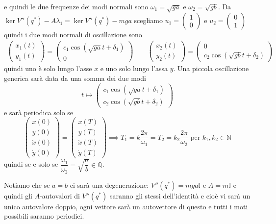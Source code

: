 \documentclass[11pt,a4paper,twoside]{book}
\newenvironment{esempio}[1][Esempio]{ 
  \begin{center}\begin{tcolorbox}[
  title={#1:\\},
  width=0.9\linewidth,
  flush right,
  enhanced jigsaw, 
  colback=white, 
  frame hidden, 
  sharpish corners, arc=3mm,
  borderline west = {1pt}{0pt}{gray},
  borderline south = {1pt}{0pt}{gray},
  coltitle=black, 
  fonttitle=\small\bfseries, 
  attach title to upper, 
  breakable,
  top=2.5pt, bottom=0.3pt]\small
  }{
 \normalsize \end{tcolorbox}\end{center}
}
\theoremstyle{esss}
\theoremstyle{dotless}
\numberwithin{equation}{section} %
\begin{document}
\begin{esempio}[Punto vincolato ad un paraboloide]
\[\]
e quindi le due frequenze dei modi normali sono $\omega_1=\sqrt{ga}$ e $\omega_2=\sqrt{gb}$.
Da $\ker{V''(q^*)-A\lambda_1}=\ker{V''(q^*)-mga}$ scegliamo $u_1=\left(\begin{array}{c}1\\0
\end{array}\right)$ e $u_2=\left(\begin{array}{c}0\\1
\end{array}\right)$ quindi i due modi normali di oscillazione sono
\begin{gather*}
\left( \begin{array}{c} x_1(t) \\y_1(t) \end{array} \right) = \left( \begin{array}{c} c_1\cos{(\sqrt{ga} t +\delta_1)} \\ 0 \end{array}\right) \qquad
\left( \begin{array}{c} x_2(t) \\y_2(t) \end{array} \right) =  \left( \begin{array}{c} 0 \\ c_2\cos{(\sqrt{gb} t +\delta_2)} \end{array}\right) 
\end{gather*}
quindi uno è solo lungo l'asse $x$ e uno solo lungo l'assa $y$. Una piccola oscillazione generica sarà data da una somma dei due modi
\[
t\mapsto \left(\begin{array}{c}
c_1\cos{(\sqrt{ga}t+\delta_1)} \\ c_2\cos{(\sqrt{gb}t+\delta_2)} 
\end{array}\right)
\]
e sarà periodica solo se
\[
\left(\begin{array}{c} x(0)\\ y(0) \\ \dot{x}(0) \\ \dot{y}(0) \end{array}\right)=\left(\begin{array}{c} x(T)\\ y(T) \\ \dot{x}(T) \\ \dot{y}(T) \end{array}\right) \implies
 T_1=k\dfrac{2\pi}{\omega_1} = T_2 = k_2 \dfrac{2\pi}{\omega_2} \text{ per } k_1,k_2\in\mathbb{N}
\]
quindi se e solo se $\dfrac{\omega_1}{\omega_2}=\sqrt{\dfrac{a}{b}}\in\mathbb{Q}$.

Notiamo che se $a=b$ ci sarà una degenerazione: $V''(q^*)=mga\mathbb{I}$ e $A=m\mathbb{I}$ e quindi gli $A$-autovalori di $V''(q^*)$ saranno gli stessi dell'identità e cioè vi sarà un unico autovalore doppio, ogni vettore sarà un autovettore di questo e tutti i moti possibili saranno periodici.
\end{esempio}
\end{document}
